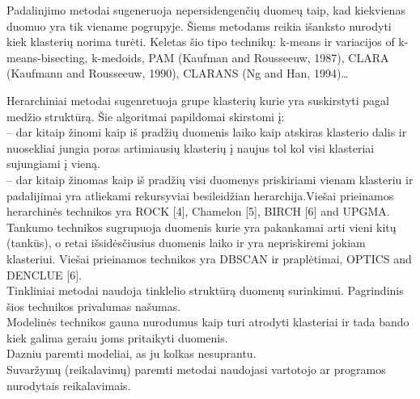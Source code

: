\documentclass{VUMIFInfKursinis}
\begin{document}
Padalinjimo metodai sugeneruoja nepersidengenčių duomeų  taip, kad kiekvienas duomuo yra tik viename pogrupyje. Šiems metodams reikia išanksto nurodyti kiek klasterių norima turėti. Keletas šio tipo technikų: k-means ir variacijos of k-means-bisecting, k-medoids, PAM (Kaufman and Rousseeuw, 1987), CLARA (Kaufmann and Rousseeuw, 1990), CLARANS (Ng and Han, 1994)\ldots

Herarchiniai metodai sugenretuoja  grupe klasterių kurie yra suskirstyti pagal medžio struktūrą. Šie algoritmai papildomai skirstomi į:\\
	 – dar kitaip žinomi kaip  iš pradžių duomenis laiko kaip atskiras klasterio dalis ir nuosekliai jungia poras artimiausių klasterių į naujus tol kol visi klasteriai sujungiami į vieną.\\
	 – dar kitaip žinomas kaip  iš pradžių visi duomenys priskiriami vienam klasteriu ir padalijimai yra atliekami rekursyviai besileidžian herarchija.Viešai prieinamos herarchinės technikos yra ROCK [4], Chamelon [5], BIRCH [6] and UPGMA. \\
	Tankumo technikos sugrupuoja duomenis kurie yra pakankamai arti vieni kitų (tankūs), o retai išsidėsčiusius duomenis laiko  ir yra nepriskiremi jokiam klasteriui. Viešai prieinamos technikos yra DBSCAN ir praplėtimai, OPTICS and DENCLUE [6].\\
	Tinkliniai metodai naudoja  tinklelio struktūrą duomenų surinkimui. Pagrindinis šios technikos privalumas \textendash{} našumas.\\
	Modelinės technikos gauna nurodumus kaip turi atrodyti klasteriai ir tada bando kiek galima geraiu joms pritaikyti duomenis.\\
	Dazniu paremti modeliai, as ju kolkas nesuprantu.\\
Suvaržymų (reikalavimų) paremti metodai naudojasi vartotojo ar programos nurodytais reikalavimais.
\end{document}

